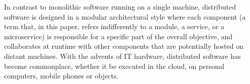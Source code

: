 %

In contrast to monolithic software running on a single machine,
distributed software is designed in a modular architectural style
where each component (a term that, in this paper, refers indifferently
to a module, a service, or a microservice) is responsible for a
specific part of the overall objective, and collaborates at runtime
with other components that are potentially hosted on distant
machines. With the advents of IT hardware, distributed software has
become commonplace, whether it be executed in the cloud, on personal
computers, mobile phones or objects.

